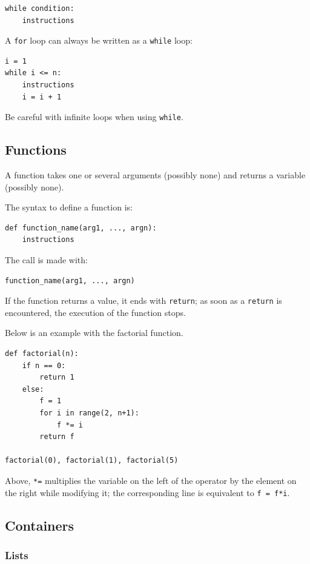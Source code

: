 \documentclass[11pt]{article}
\begin{document}
\begin{lstlisting}
while condition:
    instructions
\end{lstlisting}

A \texttt{for} loop can always be written as a \texttt{while} loop:
\begin{lstlisting}
i = 1
while i <= n:
    instructions
    i = i + 1
\end{lstlisting}

Be careful with infinite loops when using \texttt{while}.

\subsection{Functions}

A function takes one or several arguments (possibly none) and returns a variable (possibly none).

The syntax to define a function is:

\begin{lstlisting}
def function_name(arg1, ..., argn):
    instructions
\end{lstlisting}

The call is made with:

\begin{lstlisting}
function_name(arg1, ..., argn)
\end{lstlisting}

If the function returns a value, it ends with \texttt{return}; as soon as a \texttt{return} is encountered, the execution of the function stops.

Below is an example with the factorial function.

\begin{lstlisting}
def factorial(n):
    if n == 0:
        return 1
    else:
        f = 1
        for i in range(2, n+1):
            f *= i
        return f

factorial(0), factorial(1), factorial(5)
\end{lstlisting}

Above, \texttt{*=} multiplies the variable on the left of the operator by the element on the right while modifying it; the corresponding line is equivalent to \texttt{f = f*i}.

\subsection{Containers}

\subsubsection{Lists}
\end{document}
